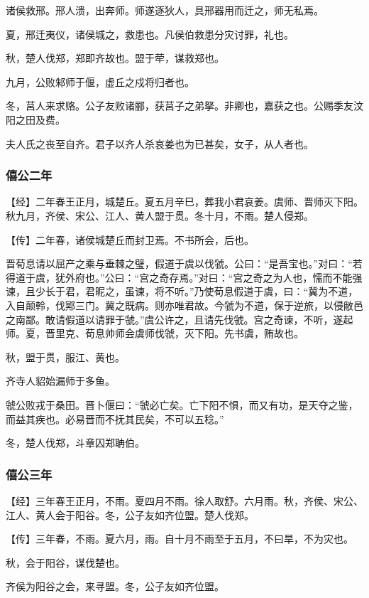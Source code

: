 \documentclass[]{article}
\begin{document}
诸侯救邢。邢人溃，出奔师。师遂逐狄人，具邢器用而迁之，师无私焉。

夏，邢迁夷仪，诸侯城之，救患也。凡侯伯救患分灾讨罪，礼也。

秋，楚人伐郑，郑即齐故也。盟于荦，谋救郑也。

九月，公败邾师于偃，虚丘之戍将归者也。

冬，莒人来求赂。公子友败诸郦，获莒子之弟拏。非卿也，嘉获之也。公赐季友汶阳之田及费。

夫人氏之丧至自齐。君子以齐人杀哀姜也为已甚矣，女子，从人者也。

\hypertarget{header-n659}{%
\subsubsection{僖公二年}\label{header-n659}}

【经】二年春王正月，城楚丘。夏五月辛巳，葬我小君哀姜。虞师、晋师灭下阳。秋九月，齐侯、宋公、江人、黄人盟于贯。冬十月，不雨。楚人侵郑。

【传】二年春，诸侯城楚丘而封卫焉。不书所会，后也。

晋荀息请以屈产之乘与垂棘之璧，假道于虞以伐虢。公曰：``是吾宝也。''对曰：``若得道于虞，犹外府也。''公曰：``宫之奇存焉。''对曰：``宫之奇之为人也，懦而不能强谏，且少长于君，君昵之，虽谏，将不听。''乃使荀息假道于虞，曰：``冀为不道，入自颠軨，伐鄍三门。冀之既病。则亦唯君故。今虢为不道，保于逆旅，以侵敝邑之南鄙。敢请假道以请罪于虢。''虞公许之，且请先伐虢。宫之奇谏，不听，遂起师。夏，晋里克、荀息帅师会虞师伐虢，灭下阳。先书虞，贿故也。

秋，盟于贯，服江、黄也。

齐寺人貂始漏师于多鱼。

虢公败戎于桑田。晋卜偃曰：``虢必亡矣。亡下阳不惧，而又有功，是天夺之鉴，而益其疾也。必易晋而不抚其民矣，不可以五稔。''

冬，楚人伐郑，斗章囚郑聃伯。

\hypertarget{header-n669}{%
\subsubsection{僖公三年}\label{header-n669}}

【经】三年春王正月，不雨。夏四月不雨。徐人取舒。六月雨。秋，齐侯、宋公、江人、黄人会于阳谷。冬，公子友如齐位盟。楚人伐郑。

【传】三年春，不雨。夏六月，雨。自十月不雨至于五月，不曰旱，不为灾也。

秋，会于阳谷，谋伐楚也。

齐侯为阳谷之会，来寻盟。冬，公子友如齐位盟。
\end{document}
